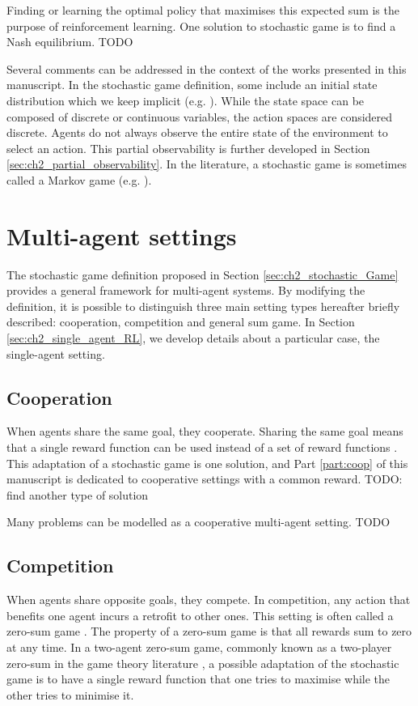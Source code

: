 Finding or learning the optimal policy that maximises this expected sum is the purpose of reinforcement learning.
One solution to stochastic game is to find a Nash equilibrium.
TODO

Several comments can be addressed in the context of the works presented in this manuscript.
In the stochastic game definition, some include an initial state distribution which we keep implicit (e.g. \citep{marl-book}).
While the state space can be composed of discrete or continuous variables, the action spaces are considered discrete.
Agents do not always observe the entire state of the environment to select an action.
This partial observability is further developed in Section \ref{sec:ch2_partial_observability}.
In the literature, a stochastic game is sometimes called a Markov game (e.g. \citep{MarkovGames}).

\section{Multi-agent settings} 
\label{sec:ch2_multi_agent_settings}
The stochastic game definition proposed in Section \ref{sec:ch2_stochastic_Game} provides a general framework for multi-agent systems.
By modifying the definition, it is possible to distinguish three main setting types hereafter briefly described: cooperation, competition and general sum game.
In Section \ref{sec:ch2_single_agent_RL}, we develop details about a particular case, the single-agent setting.

\subsection{Cooperation} 
\label{sec:ch2_Cooperation}
When agents share the same goal, they cooperate.
Sharing the same goal means that a single reward function can be used instead of a set of reward functions \citep{}.
This adaptation of a stochastic game is one solution, and Part \ref{part:coop} of this manuscript is dedicated to cooperative settings with a common reward.
TODO: find another type of solution

Many problems can be modelled as a cooperative multi-agent setting.
TODO

\subsection{Competition} 
\label{sec:ch2_Competition}
When agents share opposite goals, they compete.
In competition, any action that benefits one agent incurs a retrofit to other ones.
This setting is often called a zero-sum game \citep{}.
The property of a zero-sum game is that all rewards sum to zero at any time.
In a two-agent zero-sum game, commonly known as a two-player zero-sum in the game theory literature \citep{}, a possible adaptation of the stochastic game is to have a single reward function that one tries to maximise while the other tries to minimise it.

